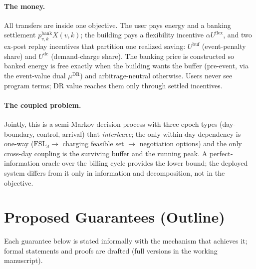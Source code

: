 \documentclass[letterpaper]{article}
\newcommand{\Uflex}{U^{\mathrm{flex}}}
\newcommand{\Ubuf}{U^{\mathrm{buf}}}
\newcommand{\banked}[2]{X(#1,#2)}            %
\newcommand{\FSL}{\mathrm{FSL}}
\newcommand{\pbank}[2]{p^{\mathrm{bank}}_{#1,#2}}  %
\newcommand{\muDR}{\mu^{\mathrm{DR}}}               %
\newcommand{\Udc}{U^{\mathrm{dc}}}                  %
\begin{document}
\paragraph{The money.} All transfers are inside one objective. The user
pays energy and a banking settlement $\pbank{v}{k}\banked{v}{k}$; the
building pays a flexibility incentive $\alpha\Uflex$, and two ex-post
replay incentives that partition one realized saving: $\Ubuf$
(event-penalty share) and $\Udc$ (demand-charge share). The banking
price is constructed so banked energy is free exactly when the building
wants the buffer (pre-event, via the event-value dual $\muDR$) and
arbitrage-neutral otherwise. Users never see program terms; DR value
reaches them only through settled incentives.

\paragraph{The coupled problem.} Jointly, this is a semi-Markov decision
process with three epoch types (day-boundary, control, arrival) that
\emph{interleave}; the only within-day dependency is one-way
($\FSL_d \to$ charging feasible set $\to$ negotiation options) and the
only cross-day coupling is the surviving buffer and the running peak. A
perfect-information oracle over the billing cycle provides the lower
bound; the deployed system differs from it only in information and
decomposition, not in the objective.

\section{Proposed Guarantees (Outline)}\label{sec:guarantees-outline}

Each guarantee below is stated informally with the mechanism that
achieves it; formal statements and proofs are drafted (full versions in
the working manuscript).
\end{document}
